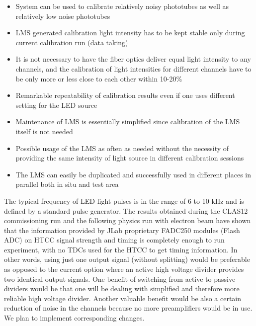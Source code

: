  \begin{itemize}
     \item System can be used to calibrate relatively noisy 
phototubes as well as relatively low noise phototubes
     \item LMS generated calibration light intensity has to be kept 
stable only during current calibration run (data taking)
     \item It is not necessary to have the fiber optics deliver equal light intensity to any channels, and the calibration of light intensities for different channels have to be only more or less close to each other within 10-20\%
     \item Remarkable repeatability of calibration results even if one uses different setting for the LED source
     \item Maintenance of LMS is essentially simplified since 
calibration of the LMS itself is not needed
     \item Possible usage of the LMS as often as needed without the necessity of providing the same intensity of light source in different calibration sessions
     \item The LMS can easily be duplicated and successfully used in different places in parallel both in situ and test area
 \end{itemize}

\indent The typical frequency of LED light pulses is in the range of 6 to 10 kHz and is defined by a standard pulse generator. The results obtained during the CLAS12 commissioning run and the following physics run with electron beam have shown that the information provided by JLab proprietary FADC250 modules (Flash ADC) on HTCC signal strength and timing is completely enough to run experiment, with no TDCs used for the HTCC to get timing information. In other words, using just one output signal (without splitting) would be preferable as opposed to the current option where an active high voltage divider provides two identical output signals. One benefit of switching from active to passive dividers would be that one will be dealing with simplified and therefore more reliable high voltage divider. Another valuable benefit would be also a certain reduction of noise in the channels because no more preamplifiers would be in use. We plan to implement corresponding changes.